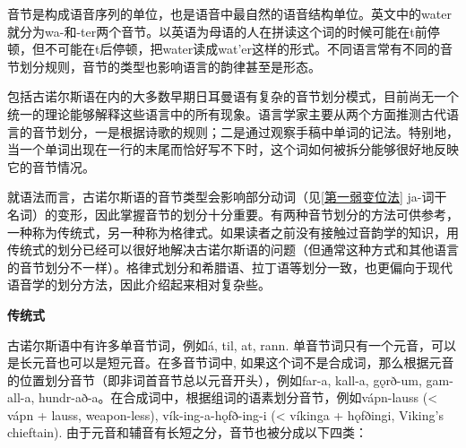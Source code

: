 音节是构成语音序列的单位，也是语音中最自然的语音结构单位。英文中的water就分为wa-和-ter两个音节。以英语为母语的人在拼读这个词的时候可能在t前停顿，但不可能在t后停顿，把water读成wat'er这样的形式。不同语言常有不同的音节划分规则，音节的类型也影响语言的韵律甚至是形态。

包括古诺尔斯语在内的大多数早期日耳曼语有复杂的音节划分模式，目前尚无一个统一的理论能够解释这些语言中的所有现象。语言学家主要从两个方面推测古代语言的音节划分，一是根据诗歌的规则；二是通过观察手稿中单词的记法。特别地，当一个单词出现在一行的末尾而恰好写不下时，这个词如何被拆分能够很好地反映它的音节情况。

就语法而言，古诺尔斯语的音节类型会影响部分动词（见\ref{第一弱变位法}
ja-词干名词）的变形，因此掌握音节的划分十分重要。有两种音节划分的方法可供参考，一种称为传统式，另一种称为格律式。如果读者之前没有接触过音韵学的知识，用传统式的划分已经可以很好地解决古诺尔斯语的问题（但通常这种方式和其他语言的音节划分不一样）。格律式划分和希腊语、拉丁语等划分一致，也更偏向于现代语音学的划分方法，因此介绍起来相对复杂些。

\textbf{传统式}

古诺尔斯语中有许多单音节词，例如á, til, at, rann.
单音节词只有一个元音，可以是长元音也可以是短元音。在多音节词中,
如果这个词不是合成词，那么根据元音的位置划分音节（即非词首音节总以元音开头），例如far-a,
kall-a, gǫrð-um, gam-all-a,
hundr-að-a。在合成词中，根据组词的语素划分音节，例如vápn-lauss
(\textless{} vápn + lauss, weapon-less), vík-ing-a-hǫfð-ing-i
(\textless{} víkinga + hǫfðingi, Viking's chieftain).
由于元音和辅音有长短之分，音节也被分成以下四类：


